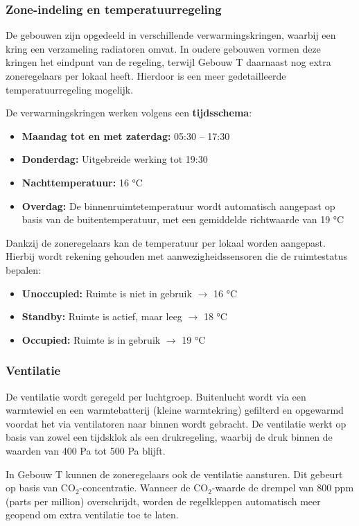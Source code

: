 \subsubsection{Zone-indeling en temperatuurregeling}
De gebouwen zijn opgedeeld in verschillende verwarmingskringen, waarbij een kring een verzameling radiatoren omvat. In oudere gebouwen vormen deze kringen het eindpunt van de regeling, terwijl Gebouw T daarnaast nog extra zoneregelaars per lokaal heeft. Hierdoor is een meer gedetailleerde temperatuurregeling mogelijk.

De verwarmingskringen werken volgens een \textbf{tijdsschema}:

\begin{itemize}
    \item \textbf{Maandag tot en met zaterdag:} 05:30 -- 17:30
    \item \textbf{Donderdag:} Uitgebreide werking tot 19:30
    \item \textbf{Nachttemperatuur:} 16 °C
    \item \textbf{Overdag:} De binnenruimtetemperatuur wordt automatisch aangepast op basis van de buitentemperatuur, met een gemiddelde richtwaarde van 19 °C
\end{itemize}

Dankzij de zoneregelaars kan de temperatuur per lokaal worden aangepast. Hierbij wordt rekening gehouden met aanwezigheidssensoren die de ruimtestatus bepalen:

\begin{itemize}
    \item \textbf{Unoccupied:} Ruimte is niet in gebruik $\rightarrow$ 16 °C
    \item \textbf{Standby:} Ruimte is actief, maar leeg $\rightarrow$ 18 °C
    \item \textbf{Occupied:} Ruimte is in gebruik $\rightarrow$ 19 °C
\end{itemize}

\subsubsection{Ventilatie}
De ventilatie wordt geregeld per luchtgroep. Buitenlucht wordt via een warmtewiel en een warmtebatterij (kleine warmtekring) gefilterd en opgewarmd voordat het via ventilatoren naar binnen wordt gebracht. De ventilatie werkt op basis van zowel een tijdsklok als een drukregeling, waarbij de druk binnen de waarden van 400 Pa tot 500 Pa blijft.

In Gebouw T kunnen de zoneregelaars ook de ventilatie aansturen. Dit gebeurt op basis van CO$_2$-concentratie. Wanneer de CO$_2$-waarde de drempel van 800 ppm (parts per million) overschrijdt, worden de regelkleppen automatisch meer geopend om extra ventilatie toe te laten.

